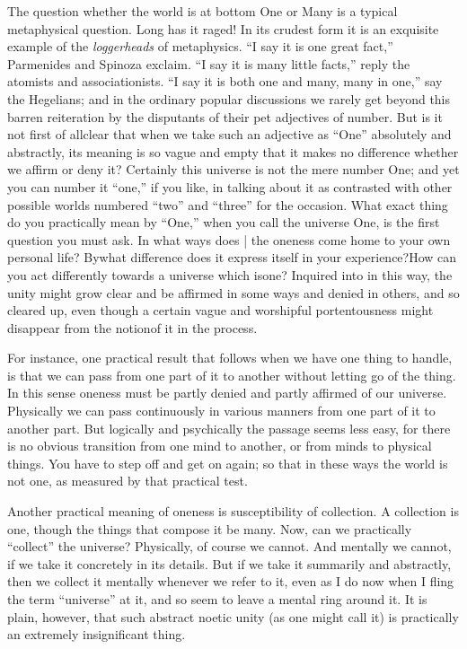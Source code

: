 \documentclass[]{article}
\begin{document}
The question whether the world is at bottom One or Many is a typical metaphysical question. Long has it raged! In its crudest form it is an exquisite example of the \emph{loggerheads} of metaphysics. ``I say it is one great  fact,'' Parmenides and Spinoza exclaim. ``I say it is many little facts,'' reply the atomists and associationists. ``I say it is both one and many, many in one,'' say the Hegelians; and in the ordinary popular discussions we rarely get beyond this barren reiteration by the disputants of their pet adjectives of number. But is it not first of allclear that when we take such an adjective as ``One'' absolutely and abstractly, its meaning is so vague and empty that it makes no difference whether we affirm or deny it? Certainly this universe is not the mere number One; and yet you can number it ``one,'' if you like, in talking about it as contrasted with other possible worlds numbered ``two'' and ``three'' for the occasion. What exact thing do you practically mean by ``One,'' when you call the universe One, is the first question you must ask. In what ways does | the oneness come home to your own personal life? Bywhat difference does it express itself in your experience?How can you act differently towards a universe which isone? Inquired into in this way, the unity might grow clear and be affirmed in some ways and denied in others, and so cleared up, even though a certain vague and worshipful portentousness might disappear from the notionof it in the process. 

For instance, one practical result that follows when we have one thing to handle, is that we can pass from one part of it to another without letting go of the thing. In this sense oneness must be partly denied and partly affirmed of our universe. Physically we can pass continuously in various manners from one part of it to another part. But logically and psychically the passage seems less easy, for there is no obvious transition from one mind to another, or from minds to physical things. You have to step off and get on again; so that in these ways the world is not one, as measured by that practical test. 

Another practical meaning of oneness is susceptibility of collection. A collection is one, though the things that compose it be many. Now, can we practically ``collect'' the universe? Physically, of course we cannot. And mentally we cannot, if we take it concretely in its details. But if we take it summarily and abstractly, then we collect it mentally whenever we refer to it, even as I do now when I fling the term ``universe'' at it, and so seem to leave a mental ring around it. It is plain, however, that such abstract noetic unity (as one might call it) is practically an extremely insignificant thing. 
\end{document}
